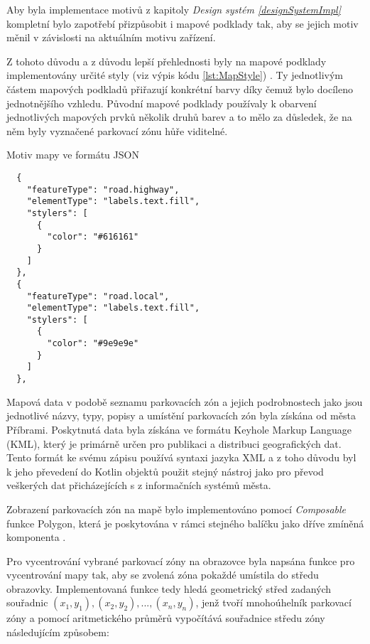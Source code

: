 
Aby byla implementace motivů z kapitoly \textit{Design systém \ref{designSystemImpl}} kompletní bylo zapotřebí přizpůsobit i mapové podklady tak,
aby se jejich motiv měnil v závislosti na aktuálním motivu zařízení.

Z tohoto důvodu a z důvodu lepší přehlednosti byly na mapové podklady implementovány určité styly (viz výpis kódu \ref{lst:MapStyle}) \cite{googleStyles}.
Ty jednotlivým částem mapových podkladů přiřazují konkrétní barvy díky čemuž bylo docíleno jednotnějšího vzhledu. Původní mapové podklady
používaly k obarvení jednotlivých mapových prvků několik druhů barev a to mělo za důsledek, že na něm byly vyznačené parkovací zónu hůře viditelné.

\begin{listing}[H]
\caption{Motiv mapy ve formátu JSON}\label{lst:MapStyle}
\begin{verbatim}
  {
    "featureType": "road.highway",
    "elementType": "labels.text.fill",
    "stylers": [
      {
        "color": "#616161"
      }
    ]
  },
  {
    "featureType": "road.local",
    "elementType": "labels.text.fill",
    "stylers": [
      {
        "color": "#9e9e9e"
      }
    ]
  },
\end{verbatim}
\end{listing}

Mapová data v podobě seznamu parkovacích zón a jejich podrobnostech jako jsou jednotlivé názvy, typy, popisy a umístění parkovacích zón byla 
získána od města Příbrami. Poskytnutá data byla získána ve formátu Keyhole Markup Language (KML), který je primárně určen pro publikaci a 
distribuci geografických dat. Tento formát ke svému zápisu používá syntaxi jazyka XML a z toho důvodu byl k jeho převedení do Kotlin objektů 
použit stejný nástroj jako pro převod veškerých dat přicházejících s z informačních systémů města.

Zobrazení parkovacích zón na mapě bylo implementováno pomocí \textit{Composable} funkce Polygon, která je poskytována v rámci stejného balíčku 
jako dříve zmíněná komponenta .

Pro vycentrování vybrané parkovací zóny na obrazovce byla napsána funkce pro vycentrování mapy tak, aby se zvolená zóna pokaždé 
umístila do středu obrazovky. Implementovaná funkce tedy hledá geometrický střed zadaných souřadnic \( (x_1, y_1), (x_2, y_2), ..., (x_n, y_n)\), 
jenž tvoří mnohoúhelník parkovací zóny a pomocí aritmetického průměrů vypočítává souřadnice středu zóny následujícím způsobem:

